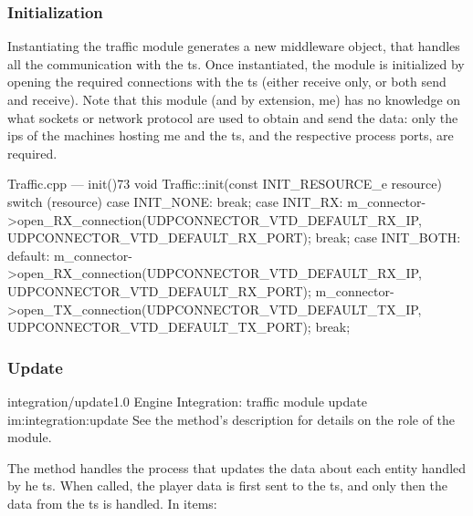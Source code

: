 \subsubsection{Initialization}

Instantiating the traffic module generates a new \gls{middleware}  object, that handles all the communication with the \gls{ts}. Once instantiated, the module is initialized by opening the required connections with the \gls{ts} (either receive only, or both send and receive). Note that this module (and by extension, \gls{me}) has no knowledge on what sockets or network protocol are used to obtain and send the data: only the \glspl{ip} of the machines hosting \gls{me} and the \gls{ts}, and the respective process ports, are required.

\begin{codelist}{Traffic.cpp --- init()}{73}
void Traffic::init(const INIT_RESOURCE_e resource) {
    switch (resource) {
        case INIT_NONE:
            break;
        case INIT_RX:
            m_connector->open_RX_connection(UDPCONNECTOR_VTD_DEFAULT_RX_IP, UDPCONNECTOR_VTD_DEFAULT_RX_PORT);
            break;
        case INIT_BOTH:
        default:
            m_connector->open_RX_connection(UDPCONNECTOR_VTD_DEFAULT_RX_IP, UDPCONNECTOR_VTD_DEFAULT_RX_PORT);
            m_connector->open_TX_connection(UDPCONNECTOR_VTD_DEFAULT_TX_IP, UDPCONNECTOR_VTD_DEFAULT_TX_PORT);
            break;
    }
}
\end{codelist}

\subsubsection{Update}

\begin{image}
	{integration/update}{1.0}
	{Engine Integration: traffic module update}
	{im:integration:update}
	{}
	{See the method's description for details on the role of the  module.}
\end{image}

The  method handles the process that updates the data about each entity handled by he \gls{ts}. When called, the player data is first sent to the \gls{ts}, and only then the data from the \gls{ts} is handled. In items:


